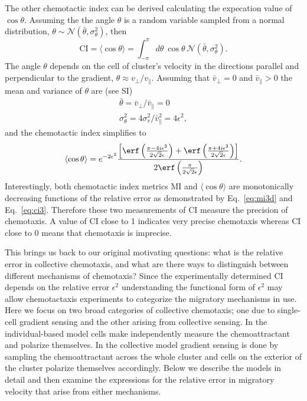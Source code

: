 The other chemotactic index can be derived calculating the expecation value of $\cos \theta$. Assuming the the angle $\theta$ is a random variable sampled from a normal distribution,
$\theta \sim \mathcal{N}(\bar{\theta},\sigma_\theta^2)$, then
\begin{equation}
    \text{CI} = \langle \cos\theta \rangle = \int_{-\pi}^{\pi} d\theta \ \cos\theta \ \mathcal{N}(\bar{\theta},\sigma_\theta^2) .
\end{equation}
The angle $\theta$ depends on the cell of cluster's velocity in the directions parallel and perpendicular to the gradient,
$\theta \approx v_\perp / v_\parallel$. Assuming that $\bar{v}_\perp = 0$ and $\bar{v}_\parallel > 0$ the mean and variance of $\theta$ are (see SI)
\begin{gather}
    \bar{\theta} = \bar{v}_\perp / \bar{v}_\parallel = 0 \\
    \sigma_\theta^2 = 4\sigma_v^2 / \bar{v}^2_\parallel = 4 \epsilon^2 ,
\end{gather}
and the chemotactic index simplifies to
\begin{equation} \label{eq:ci3}
    \langle \cos\theta \rangle =
    e^{-2\epsilon^2} \frac{
    \left[ \erf\left( \frac{\pi-4i\epsilon^2}{2\sqrt{2}\epsilon} \right) + \erf\left( \frac{\pi+4i\epsilon^2}{2\sqrt{2}\epsilon} \right) \right] }
    {2 \erf\left( \frac{\pi}{2\sqrt{2}\epsilon}\right)} .
\end{equation}
Interestingly, both chemotactic index metrics MI and $\langle \cos\theta \rangle$ are monotonically decreasing functions of the relative error as demonstrated by Eq.\ \ref{eq:mi3d} and Eq.\ \ref{eq:ci3}. Therefore these two measurements of CI measure the precision of chemotaxis. A value of CI close to 1 indicates very precise chemotaxis whereas CI close to 0 means that chemotaxis is imprecise.

This brings us back to our original motivating questions: what is the relative error in collective chemotaxis, and what are there ways to distinguish between different mechanisms of chemotaxis? Since the experimentally determined CI depends on the relative error $\epsilon^2$ understanding the functional form of $\epsilon^2$ may allow chemotactaxis experiments to categorize the migratory mechanisms in use. Here we focus on two broad categories of collective chemotaxis; one due to single-cell gradient sensing and the other arising from collective sensing. In the individual-based model cells make independently measure the chemoattractant and polarize themselves. In the collective model gradient sensing is done by sampling the chemoattractant across the whole cluster and cells on the exterior of the cluster polarize themselves accordingly. Below we describe the models in detail and then examine the expressions for the relative error in migratory velocity that arise from either mechanisms.
